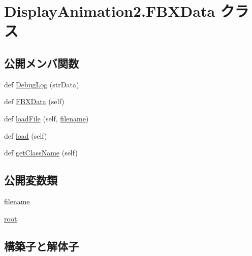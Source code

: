 \hypertarget{class_display_animation2_1_1_f_b_x_data}{}\section{Display\+Animation2.\+F\+B\+X\+Data クラス}
\label{class_display_animation2_1_1_f_b_x_data}
\subsection*{公開メンバ関数}
\begin{DoxyCompactItemize}
\item 
def \hyperlink{class_display_animation2_1_1_f_b_x_data_ac4308158d12bf29b4046888f4291efa6}{Debug\+Log} (str\+Data)
\item 
def \hyperlink{class_display_animation2_1_1_f_b_x_data_a0af6ea8d0c465b9275e5a85b430466f8}{F\+B\+X\+Data} (self)
\item 
def \hyperlink{class_display_animation2_1_1_f_b_x_data_a2b36958d945c1387caff8dfb5b19a69e}{load\+File} (self, \hyperlink{class_display_animation2_1_1_f_b_x_data_a3841b6e3dd4a634cd84b7568959830a6}{filename})
\item 
def \hyperlink{class_display_animation2_1_1_f_b_x_data_a853390797e814bd28d589c58adffac68}{load} (self)
\item 
def \hyperlink{class_display_animation2_1_1_f_b_x_data_ab3ecda3bc5f145494ab2853f362e2038}{get\+Class\+Name} (self)
\end{DoxyCompactItemize}
\subsection*{公開変数類}
\begin{DoxyCompactItemize}
\item 
\hyperlink{class_display_animation2_1_1_f_b_x_data_a3841b6e3dd4a634cd84b7568959830a6}{filename}
\item 
\hyperlink{class_display_animation2_1_1_f_b_x_data_a29126173d4927c772739a4ba4ef5bd67}{root}
\end{DoxyCompactItemize}


\subsection{構築子と解体子}
\mbox{\label{class_display_animation2_1_1_f_b_x_data_a0af6ea8d0c465b9275e5a85b430466f8}} 
